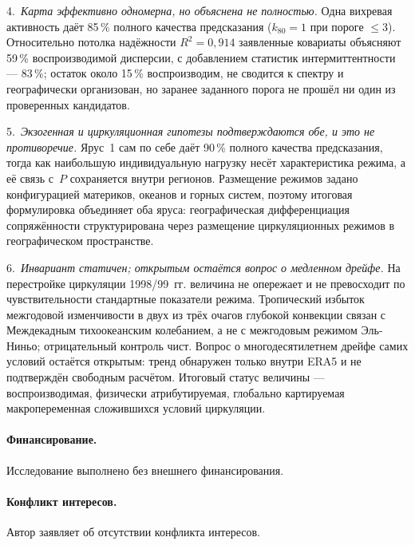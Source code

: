 \documentclass[11pt,a4paper]{article}
\begin{document}
4.~\emph{Карта эффективно одномерна, но объяснена не полностью.} Одна вихревая активность даёт
85\,\% полного качества предсказания ($k_{80}=1$ при пороге $\le3$). Относительно потолка
надёжности $R^2=0{,}914$ заявленные ковариаты объясняют 59\,\% воспроизводимой дисперсии,
с добавлением статистик интермиттентности --- 83\,\%; остаток около 15\,\% воспроизводим,
не сводится к спектру и географически организован, но заранее заданного порога не прошёл ни один
из проверенных кандидатов.

5.~\emph{Экзогенная и циркуляционная гипотезы подтверждаются обе, и это не противоречие.} Ярус~1
сам по себе даёт 90\,\% полного качества предсказания, тогда как наибольшую индивидуальную
нагрузку несёт характеристика режима, а её связь с~$P$ сохраняется внутри регионов. Размещение
режимов задано конфигурацией материков, океанов и горных систем, поэтому итоговая формулировка
объединяет оба яруса: географическая дифференциация сопряжённости структурирована через
размещение циркуляционных режимов в географическом пространстве.

6.~\emph{Инвариант статичен; открытым остаётся вопрос о медленном дрейфе.} На перестройке
циркуляции 1998/99~гг. величина не опережает и не превосходит по чувствительности стандартные
показатели режима. Тропический избыток межгодовой изменчивости в двух из трёх очагов глубокой
конвекции связан с Междекадным тихоокеанским колебанием, а не с межгодовым режимом Эль-Ниньо;
отрицательный контроль чист. Вопрос о многодесятилетнем дрейфе самих условий остаётся открытым:
тренд обнаружен только внутри ERA5 и не подтверждён свободным расчётом. Итоговый статус величины
--- воспроизводимая, физически атрибутируемая, глобально картируемая макропеременная сложившихся
условий циркуляции.

\paragraph{Финансирование.} Исследование выполнено без внешнего финансирования.

\paragraph{Конфликт интересов.} Автор заявляет об отсутствии конфликта интересов.
\end{document}
